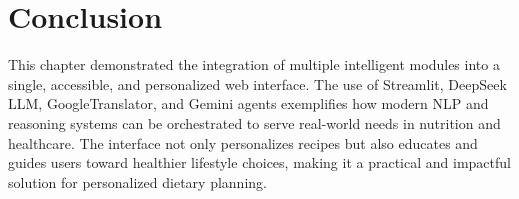 \documentclass[letterpaper,11pt]{report}
\begin{document}
\newpage
\section{Conclusion}

This chapter demonstrated the integration of multiple intelligent modules into a single, accessible, and personalized web interface. The use of Streamlit, DeepSeek LLM, GoogleTranslator, and Gemini agents exemplifies how modern NLP and reasoning systems can be orchestrated to serve real-world needs in nutrition and healthcare. The interface not only personalizes recipes but also educates and guides users toward healthier lifestyle choices, making it a practical and impactful solution for personalized dietary planning.








\end{document}
